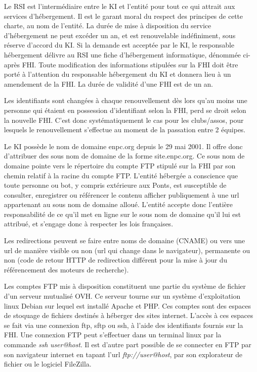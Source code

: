 \documentclass{ki019}
\begin{document}
Le RSI est l'intermédiaire entre le KI et l'entité pour tout ce qui attrait aux services d'hébergement. Il est le garant moral du respect des principes de cette charte, au nom de l'entité. La durée de mise à disposition du service d'hébergement ne peut excéder un an, et est renouvelable indéfiniment, sous réserve d'accord du KI.
Si la demande est acceptée par le KI, le responsable hébergement délivre au RSI une fiche d'hébergement informatique, dénommée ci-après FHI. Toute modification des informations stipulées sur la FHI doit être porté à l'attention du responsable hébergement du KI et donnera lieu à un amendement de la FHI. La durée de validité d'une FHI est de un an.


Les identifiants sont changées à chaque renouvellement dès lors qu'au moins une personne qui étaient en possession d'identifiant selon la FHI, perd se droit selon la nouvelle FHI. C'est donc systématiquement le cas pour les clubs/assos, pour lesquels le renouvellement s'effectue au moment de la passation entre 2 équipes.


Le KI possède le nom de domaine enpc.org depuis le 29 mai 2001. Il offre donc d'attribuer des sous nom de domaine de la forme site.enpc.org. Ce sous nom de domaine pointe vers le répertoire du compte FTP stipulé sur la FHI par son chemin relatif à la racine du compte FTP.		%
L'entité hébergée a conscience que toute personne ou bot, y compris extérieure aux Ponts, est susceptible de consulter, enregistrer ou référencer le contenu afficher publiquement à une url appartenant au sous nom de domaine alloué. L'entité accepte donc l'entière responsabilité de ce qu'il met en ligne sur le sous nom de domaine qu'il lui est attribué, et s'engage donc à respecter les lois françaises.

Les redirections peuvent se faire entre noms de domaine (CNAME) ou vers une url de manière visible ou non (url qui change dans le navigateur), permanente ou non (code de retour HTTP de redirection différent pour la mise à jour du référencement des moteurs de recherche).


Les comptes FTP mis à disposition constituent une partie du système de fichier d'un serveur mutualisé OVH. Ce serveur tourne sur un système d'exploitation linux Debian sur lequel est installé Apache et PHP. Ces comptes sont des espaces de stoquage de fichiers destinés à héberger des sites internet. L'accès à ces espaces se fait via une connexion ftp, sftp ou ssh, à l'aide des identifiants fournis sur la FHI. Une connexion FTP peut s'effectuer dans un terminal linux par la commande \textit{ssh user@host}. Il est d'autre part possible de se connecter en FTP par son navigateur internet en tapant l'url \textit{ftp://user@host}, par son explorateur de fichier ou le logiciel FileZilla.
\end{document}
